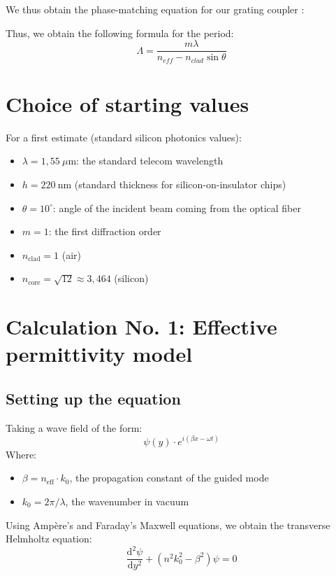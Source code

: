 \documentclass[a4paper,11pt]{report}
\begin{document}
We thus obtain the phase-matching equation for our grating coupler :

Thus, we obtain the following formula for the period:
\begin{equation}
\boxed{\Lambda = \frac{m\lambda}{n_{eff} - n_{clad}\sin\theta}}
\label{eq:lambda_theorique}
\end{equation}

\section{Choice of starting values}
For a first estimate (standard silicon photonics values):
\begin{itemize}
    \item $\lambda = 1{,}55~\mu\text{m}$: the standard telecom wavelength 
    \item $h = 220 ~\text{nm}$ (standard thickness for silicon-on-insulator chips)
    \item $\theta = 10^\circ$: angle of the incident beam coming from the optical fiber
    \item $m = 1$: the first diffraction order
    \item $n_{\text{clad}} = 1$ (air)
    \item $n_{\text{core}} = \sqrt{12} \approx 3{,}464$ (silicon)

\end{itemize}

\section{Calculation No. 1: Effective permittivity model}
\label{sec:calcul_neff}

\subsection*{Setting up the equation}

Taking a wave field of the form:
\begin{equation}
\psi(y) \cdot e^{i (\beta x - \omega t)}
\end{equation}
Where:
\begin{itemize}
\item $\beta=n_{\text{eff}}\cdot k_0$, the propagation constant of the guided mode
\item $k_0=2\pi/\lambda$, the wavenumber in vacuum
\end{itemize}
Using Ampère's and Faraday's Maxwell equations, we obtain the transverse Helmholtz equation:
\begin{equation}
\frac{\text{d}^2\psi}{\text{d}y^2} + (n^2 k_0^2 - \beta^2) \psi = 0
\end{equation}
\end{document}
